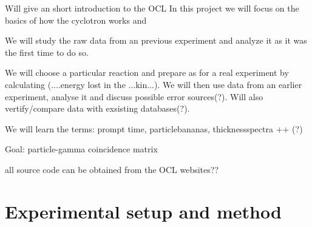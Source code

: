 \documentclass[11pt,a4wide]{article}
\begin{document}
Will give an short introduction to the OCL
In this project we will focus on the basics of how the cyclotron works and 

We will study the raw data from an previous experiment and analyze it as it was the first time to do so. 




We will choose a particular reaction and prepare as for a real experiment by calculating (....energy lost in the ...kin...). We will then use data from an earlier experiment, analyse it and discuss possible error sources(?). Will also vertify/compare data with exsisting databases(?).

We will learn the terms: prompt time, particlebananas, thicknessspectra ++ (?)

Goal: particle-gamma coincidence matrix




all source code can be obtained from the OCL websites??

\section{Experimental setup and method}
\end{document}
